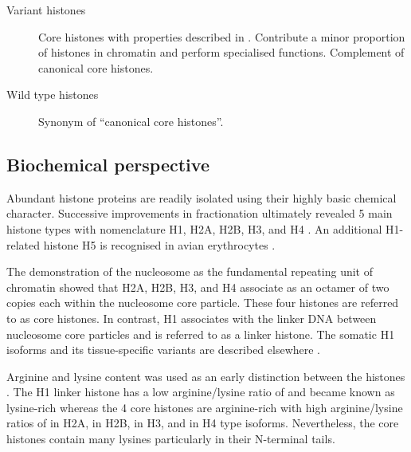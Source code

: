 {\begin{shaded}
\begin{description}
        \item[Variant histones] \hfill \newline
        Core histones with properties described in .
        Contribute a minor proportion of histones in chromatin and perform specialised functions.
        Complement of canonical core histones.

        \item[Wild type histones] \hfill \newline
        Synonym of ``canonical core histones''.
      \end{description}
    \end{shaded}
  }

  \subsection{Biochemical perspective}

    Abundant histone proteins are readily isolated using their
    highly basic chemical character.
    Successive improvements in fractionation ultimately revealed 5 main histone types
    with nomenclature H1, H2A, H2B, H3, and H4 \citep{nomenclature}.
    An additional H1-related histone H5 is recognised in avian erythrocytes \citep{HFive-review}.

    The demonstration of the nucleosome as the fundamental
    repeating unit of chromatin \citep{Kornberg1974}
    showed that H2A, H2B, H3, and H4 associate as an octamer of two copies each within the
    nucleosome core particle. These four histones are referred to as core histones.
    In contrast, H1 associates with the linker DNA between nucleosome core particles
    and is referred to as a linker histone.
    The somatic H1 isoforms and its tissue-specific
    variants are described elsewhere \citep{HarshmanFreitas2013}.

    Arginine and lysine content was used as an early distinction between the histones \citep{ElginWeintraub1975}.
    The H1 linker histone has a low arginine/lysine ratio of
     \result{}
    and became known as lysine-rich
    whereas the 4 core histones are arginine-rich
    with high arginine/lysine ratios of
     \result{} in H2A,
     \result{} in H2B,
     \result{} in H3,
    and  \result{} in H4 type isoforms.
    Nevertheless, the core histones contain many lysines particularly in their N-terminal tails.


